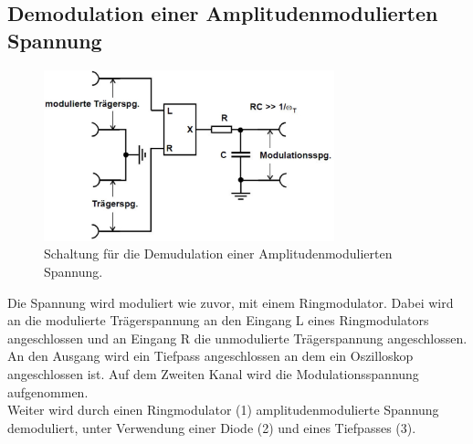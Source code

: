 \subsection{Demodulation einer Amplitudenmodulierten Spannung}
\begin{figure}[h!]
	\centering
	\includegraphics[width = 0.75\textwidth]{../Grafiken/Versuchsaufbau_DemAmplitude_Ringmodulator.pdf}
	\caption{Schaltung für die Demudulation einer Amplitudenmodulierten Spannung.\cite{V59}}
\end{figure}
Die Spannung wird moduliert wie zuvor, mit einem Ringmodulator. 
Dabei wird an die modulierte Trägerspannung an den Eingang L eines Ringmodulators angeschlossen und an Eingang R die unmodulierte Trägerspannung angeschlossen.
An den Ausgang wird ein Tiefpass angeschlossen an dem ein Oszilloskop angeschlossen ist.
Auf dem Zweiten Kanal wird die Modulationsspannung aufgenommen.\\
Weiter wird durch einen Ringmodulator (1) amplitudenmodulierte Spannung demoduliert, unter Verwendung einer Diode (2) und eines Tiefpasses (3).
